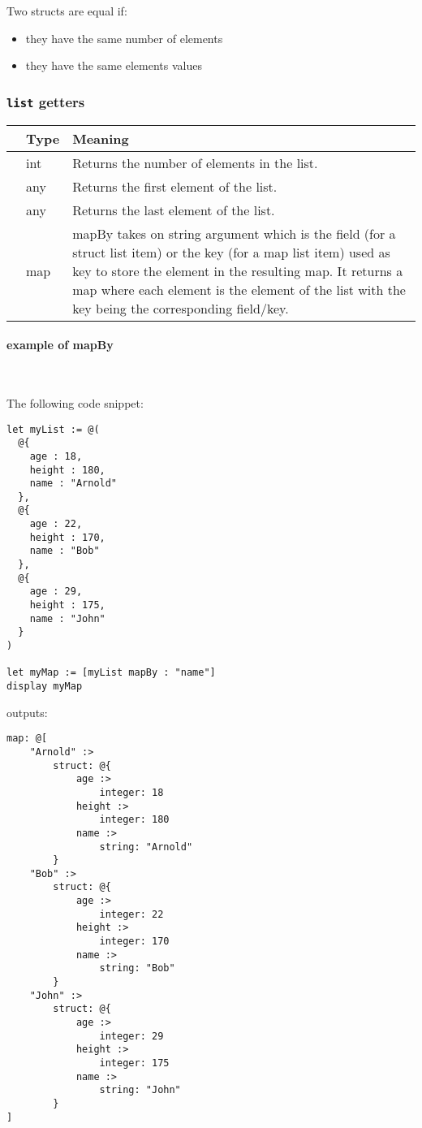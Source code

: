 \documentclass[11pt]{article}
\newcommand{\cfunction}[1]{{\ttfamily #1}}
\begin{document}
Two structs are equal if:
\begin{itemize}
\item they have the same number of elements
\item they have the same elements values
\end{itemize}

\subsubsection{\lstinline{list} getters}

\begin{longtable}{>{\ttfamily}l|l|p{4.41in}}
{\bf getter}&{\bf Type}&{\bf Meaning}\\
\hline\endhead
 {length}&
  {int}&
  {Returns the number of elements in the list.}\\
 {first}&
  {any}&
  {Returns the first element of the list.}\\
 {last}&
  {any}&
  {Returns the last element of the list.}\\
 {mapBy}&
  {map}&
  {\cfunction{mapBy} takes on string argument which is the field (for a struct list item) or the key (for a map list item) used as key to store the element in the resulting map. It returns a map where each element is the element of the list with the key being the corresponding field/key.}\\
\end{longtable}

\paragraph{example of \cfunction{mapBy}}~

The following code snippet:

\begin{lstlisting}[language=goilTemplate]
let myList := @(
  @{
    age : 18,
    height : 180,
    name : "Arnold"
  },
  @{
    age : 22,
    height : 170,
    name : "Bob"
  },
  @{
    age : 29,
    height : 175,
    name : "John"
  }
)

let myMap := [myList mapBy : "name"]
display myMap
\end{lstlisting}

outputs:
\begin{lstlisting}[language=goilTemplate]
map: @[
    "Arnold" :>
        struct: @{
            age :>
                integer: 18
            height :>
                integer: 180
            name :>
                string: "Arnold"
        }
    "Bob" :>
        struct: @{
            age :>
                integer: 22
            height :>
                integer: 170
            name :>
                string: "Bob"
        }
    "John" :>
        struct: @{
            age :>
                integer: 29
            height :>
                integer: 175
            name :>
                string: "John"
        }
]
\end{lstlisting}
\end{document}
